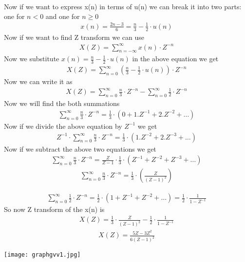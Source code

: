 \documentclass[journal,12pt,twocolumn]{IEEEtran}
\theoremstyle{remark}
\begin{document}
Now if we want to express x(n) in terms of u(n) we can break it into two parts: one for $n < 0 $ and one for $ n \ge 0$  
\begin{align} x(n) = \frac{2n-3}{6} = \frac{n}{3} - \frac{1}{2} \cdot u(n) \end{align}
\bigskip
Now if we want to find Z transform we can use
\begin{align} X(Z) = \sum_{n = -\infty}^{\infty} x(n) \cdot Z^{-n} \end{align}
\bigskip
Now we substitute
$x(n) = \frac{n}{3} - \frac{1}{2} \cdot u(n)$ in the above equation we get
\begin{align} X(Z) = \sum_{n = 0}^{\infty} (\frac{n}{3} - \frac{1}{2} \cdot u(n) )\cdot Z^{-n} \end{align}
\bigskip
Now we can write it as
\begin{align} X(Z) = \sum_{n=0}^{\infty} \frac{n}{3} \cdot Z^{-n} - \sum_{n=0}^{\infty} \frac{1}{2} \cdot Z^{-n} \end{align}
\bigskip
Now we will find the both summations
\begin{align} \sum_{n=0}^{\infty} \frac{n}{3} \cdot Z^{-n} = \frac{1}{3} \cdot (0 + 1.Z^{-1} + 2.Z^{-2} + \ldots) \end{align}
\bigskip
Now if we divide the above equation by $Z^{-1}$ we get
\begin{align} Z^{-1} \cdot \sum_{n=0}^{\infty} \frac{n}{3} \cdot Z^{-n} =\frac{1}{3} \cdot (1.Z^{-2} + 2.Z^{-3} + \ldots ) \end{align}
\bigskip
Now if we subtract the above two equations we get
\begin{align} \sum_{n=0}^{\infty} \frac{n}{3} \cdot Z^{-n} = \frac{Z}{Z-1} \cdot \frac{1}{3} \cdot (Z^{-1} + Z^{-2} + Z^{-3} + \ldots) \end{align}
\begin{align} \sum_{n=0}^{\infty} \frac{n}{3} \cdot Z^{-n} = \frac{1}{3} \cdot \left(\frac{Z}{(Z-1)^{2}}\right) \end{align}
\newpage

\begin{align} \sum_{n=0}^{\infty} \frac{1}{2} \cdot Z^{-n} = \frac{1}{2} \cdot (1+Z^{-1} + Z^{-2} + \ldots) = \frac{1}{2} \cdot \frac{1}{1- Z^{-1}} \end{align}
So now Z transform of the x(n) is
\begin{align} X(Z) = \frac{1}{3} \cdot \frac{Z}{(Z-1)^{2}} - \frac{1}{2} \cdot \frac{1}{1-Z^{-1}} \end{align}
\begin{align} X(Z) = {\frac{5Z-3 Z^{2}}{6(Z-1)^{2}}} \end{align}

\texttt{[image: graphgvv1.jpg]}
\end{document}
